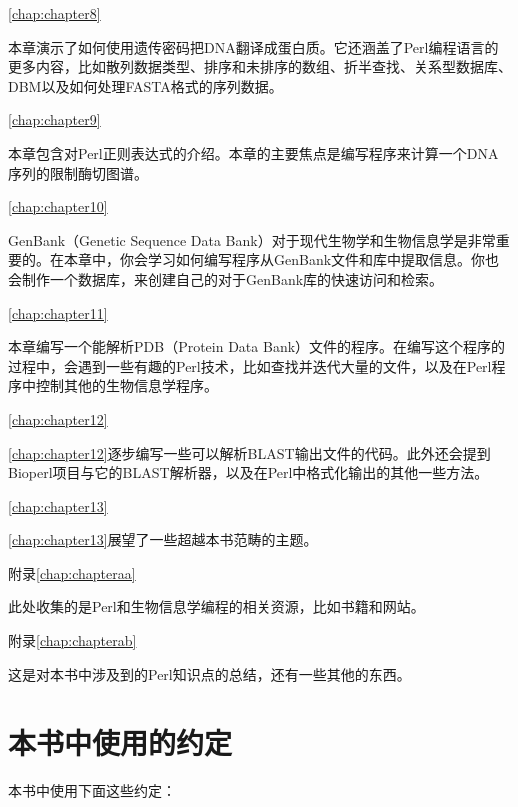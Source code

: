 \autoref{chap:chapter8}
\begin{adjustwidth}{1cm}{0cm}
本章演示了如何使用遗传密码把DNA翻译成蛋白质。它还涵盖了Perl编程语言的更多内容，比如散列数据类型、排序和未排序的数组、折半查找、关系型数据库、DBM以及如何处理FASTA格式的序列数据。
\end{adjustwidth}

\autoref{chap:chapter9}
\begin{adjustwidth}{1cm}{0cm}
本章包含对Perl正则表达式的介绍。本章的主要焦点是编写程序来计算一个DNA序列的限制酶切图谱。
\end{adjustwidth}

\autoref{chap:chapter10}
\begin{adjustwidth}{1cm}{0cm}
GenBank（Genetic Sequence Data Bank）对于现代生物学和生物信息学是非常重要的。在本章中，你会学习如何编写程序从GenBank文件和库中提取信息。你也会制作一个数据库，来创建自己的对于GenBank库的快速访问和检索。
\end{adjustwidth}

\autoref{chap:chapter11}
\begin{adjustwidth}{1cm}{0cm}
本章编写一个能解析PDB（Protein Data Bank）文件的程序。在编写这个程序的过程中，会遇到一些有趣的Perl技术，比如查找并迭代大量的文件，以及在Perl程序中控制其他的生物信息学程序。
\end{adjustwidth}

\autoref{chap:chapter12}
\begin{adjustwidth}{1cm}{0cm}
\autoref{chap:chapter12}逐步编写一些可以解析BLAST输出文件的代码。此外还会提到Bioperl项目与它的BLAST解析器，以及在Perl中格式化输出的其他一些方法。
\end{adjustwidth}

\autoref{chap:chapter13}
\begin{adjustwidth}{1cm}{0cm}
\autoref{chap:chapter13}展望了一些超越本书范畴的主题。
\end{adjustwidth}

附录\autoref{chap:chapteraa}
\begin{adjustwidth}{1cm}{0cm}
此处收集的是Perl和生物信息学编程的相关资源，比如书籍和网站。
\end{adjustwidth}

附录\autoref{chap:chapterab}
\begin{adjustwidth}{1cm}{0cm}
这是对本书中涉及到的Perl知识点的总结，还有一些其他的东西。
\end{adjustwidth}

\section*{本书中使用的约定}
本书中使用下面这些约定：

